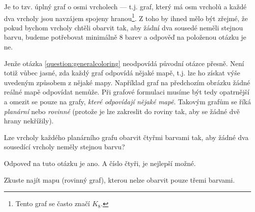 \begin{center}
\end{center}

Je to tzv. úplný graf o osmi vrcholech --- t.j. graf, který má osm vrcholů a každé dva vrcholy jsou navzájem spojeny hranou\footnote{Tento graf se často značí $K_8$.}. Z toho by ihned mělo být zřejmé, že pokud bychom vrcholy chtěli obarvit tak, aby žádní dva sousedé neměli stejnou barvu, budeme potřebovat minimálně 8 barev a odpověď na položenou otázku je ne.

Jenže otázka \ref{question:generalcoloring} neodpovídá původní otázce přesně. Není
totiž vůbec jasné, zda každý graf odpovídá nějaké mapě, t.j. lze ho získat výše uvedeným způsobem z nějaké mapy. Například graf na předchozím obrázku žádné reálné
mapě odpovídat nemůže. Při grafové formulaci musíme být tedy opatrnější a omezit
se pouze na grafy, \emph{které odpovídají nějaké mapě}. Takovým grafům se říká 
\emph{planární} nebo \emph{rovinné} (protože je lze zakreslit do roviny tak, aby se žádné dvě hrany nekřížily).

\begin{question}\label{question:planarcoloring} Lze vrcholy každého planárního grafu obarvit čtyřmi barvami tak, aby žádné dva sousedící vrcholy neměly stejnou barvu?
\end{question}

Odpoveď na tuto otázku je ano. A číslo čtyři, je nejlepší možné.

\begin{cviceni} Zkuste najít mapu (rovinný graf), kterou nelze obarvit pouze třemi barvami.
\end{cviceni}

